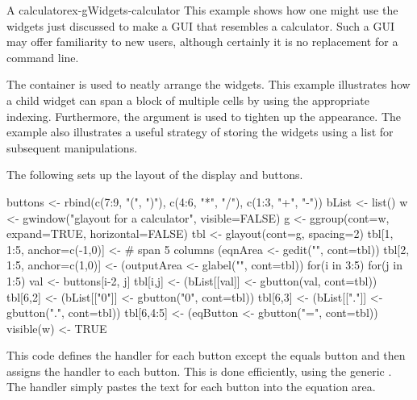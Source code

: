 \begin{example}{A calculator}{ex-gWidgets-calculator}
This example shows how one might use the widgets just
discussed to make a GUI that resembles a calculator. Such a GUI may offer
familiarity to new \R\/ users, although certainly it is no replacement
for a command line.

The  container is used to neatly arrange the
widgets. This example illustrates how a child widget can span a block
of multiple cells by using the appropriate indexing. Furthermore, the
 argument is used to tighten up the appearance. The
example also illustrates a useful strategy of storing the widgets
using a list for subsequent manipulations.

The following sets up the layout of the display and buttons.
\begin{Schunk}
\begin{Sinput}
 buttons <- rbind(c(7:9, "(", ")"),
                  c(4:6, "*", "/"),
                  c(1:3, "+", "-"))
 bList <- list()
 w <- gwindow("glayout for a calculator", visible=FALSE)
 g <- ggroup(cont=w, expand=TRUE, horizontal=FALSE)
 tbl <- glayout(cont=g, spacing=2)
 tbl[1, 1:5, anchor=c(-1,0)] <-          # span 5 columns
   (eqnArea <- gedit("", cont=tbl))
 tbl[2, 1:5, anchor=c(1,0)] <- 
   (outputArea <- glabel("", cont=tbl))
 for(i in 3:5) {
   for(j in 1:5) {
     val <- buttons[i-2, j]
     tbl[i,j] <- (bList[[val]] <- gbutton(val, cont=tbl))
   }
 }
 tbl[6,2] <- (bList[["0"]] <- gbutton("0", cont=tbl))
 tbl[6,3] <- (bList[["."]] <- gbutton(".", cont=tbl))
 tbl[6,4:5] <- (eqButton <- gbutton("=", cont=tbl))
 visible(w) <- TRUE
\end{Sinput}
\end{Schunk}

This code defines the handler for each button except the equals button
and then assigns the handler to each button. This is done efficiently,
using the generic . The handler simply pastes
the text for each button into the equation area.

\begin{Schunk}
\end{Schunk}


\end{example}
